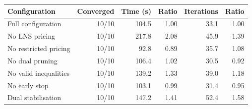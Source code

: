 \begin{tabular}{lrrrrr}
\toprule
Configuration & Converged & Time (s) & Ratio & Iterations & Ratio \\
\midrule
Full configuration & 10/10 & 104.5 & 1.00 & 33.1 & 1.00 \\
No LNS pricing & 10/10 & 217.8 & 2.08 & 45.9 & 1.39 \\
No restricted pricing & 10/10 & 92.8 & 0.89 & 35.7 & 1.08 \\
No dual pruning & 10/10 & 106.4 & 1.02 & 30.5 & 0.92 \\
No valid inequalities & 10/10 & 139.2 & 1.33 & 39.0 & 1.18 \\
No early stop & 10/10 & 103.1 & 0.99 & 31.4 & 0.95 \\
Dual stabilisation & 10/10 & 147.2 & 1.41 & 52.4 & 1.58 \\
\bottomrule
\end{tabular}
